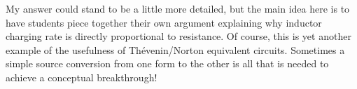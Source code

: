





My answer could stand to be a little more detailed, but the main idea here is to have students piece together their own argument explaining why inductor charging rate is directly proportional to resistance.  Of course, this is yet another example of the usefulness of Th\'evenin/Norton equivalent circuits.  Sometimes a simple source conversion from one form to the other is all that is needed to achieve a conceptual breakthrough!





